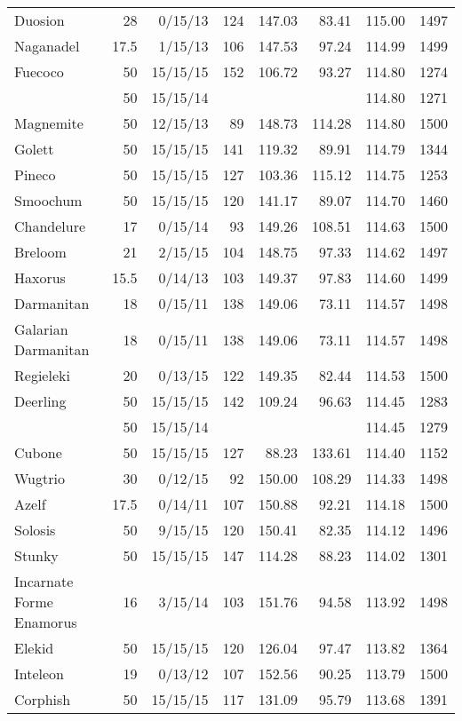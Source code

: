 \begin{longtable}{lrrrrrrr}
Duosion & 28 & 0/15/13 & 124 & 147.03 & 83.41 & 115.00 & 1497\\
Naganadel & 17.5 & 1/15/13 & 106 & 147.53 & 97.24 & 114.99 & 1499\\
Fuecoco & 50 & 15/15/15 & 152 & 106.72 & 93.27 & 114.80 & 1274\\
 & 50 & 15/15/14 & & & & 114.80 & 1271\\
Magnemite & 50 & 12/15/13 & 89 & 148.73 & 114.28 & 114.80 & 1500\\
Golett & 50 & 15/15/15 & 141 & 119.32 & 89.91 & 114.79 & 1344\\
Pineco & 50 & 15/15/15 & 127 & 103.36 & 115.12 & 114.75 & 1253\\
Smoochum & 50 & 15/15/15 & 120 & 141.17 & 89.07 & 114.70 & 1460\\
Chandelure & 17 & 0/15/14 & 93 & 149.26 & 108.51 & 114.63 & 1500\\
Breloom & 21 & 2/15/15 & 104 & 148.75 & 97.33 & 114.62 & 1497\\
Haxorus & 15.5 & 0/14/13 & 103 & 149.37 & 97.83 & 114.60 & 1499\\
Darmanitan & 18 & 0/15/11 & 138 & 149.06 & 73.11 & 114.57 & 1498\\
Galarian Darmanitan & 18 & 0/15/11 & 138 & 149.06 & 73.11 & 114.57 & 1498\\
Regieleki & 20 & 0/13/15 & 122 & 149.35 & 82.44 & 114.53 & 1500\\
Deerling & 50 & 15/15/15 & 142 & 109.24 & 96.63 & 114.45 & 1283\\
 & 50 & 15/15/14 & & & & 114.45 & 1279\\
Cubone & 50 & 15/15/15 & 127 & 88.23 & 133.61 & 114.40 & 1152\\
Wugtrio & 30 & 0/12/15 & 92 & 150.00 & 108.29 & 114.33 & 1498\\
Azelf & 17.5 & 0/14/11 & 107 & 150.88 & 92.21 & 114.18 & 1500\\
Solosis & 50 & 9/15/15 & 120 & 150.41 & 82.35 & 114.12 & 1496\\
Stunky & 50 & 15/15/15 & 147 & 114.28 & 88.23 & 114.02 & 1301\\
Incarnate Forme Enamorus & 16 & 3/15/14 & 103 & 151.76 & 94.58 & 113.92 & 1498\\
Elekid & 50 & 15/15/15 & 120 & 126.04 & 97.47 & 113.82 & 1364\\
Inteleon & 19 & 0/13/12 & 107 & 152.56 & 90.25 & 113.79 & 1500\\
Corphish & 50 & 15/15/15 & 117 & 131.09 & 95.79 & 113.68 & 1391\\

\end{longtable}
